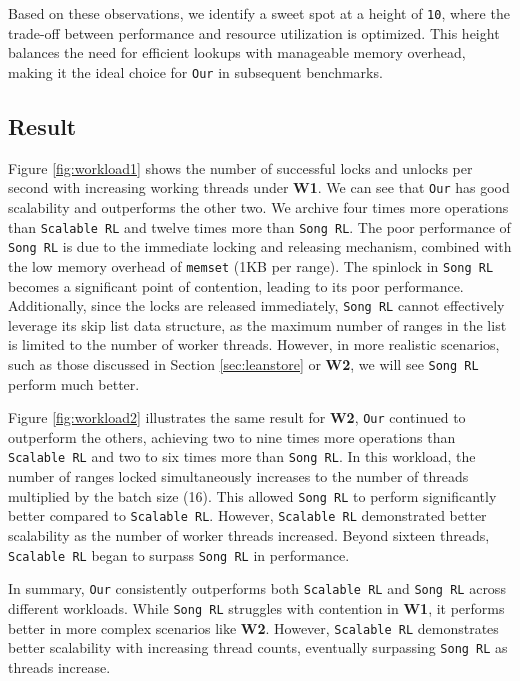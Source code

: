 Based on these observations, we identify a sweet spot at a height of \texttt{10}, where the trade-off between performance and resource utilization is optimized. 
This height balances the need for efficient lookups with manageable memory overhead, making it the ideal choice for \texttt{Our} in subsequent benchmarks.

\subsection{Result}

Figure \ref{fig:workload1} shows the number of successful locks and unlocks per second with increasing working threads under \textbf{W1}. We can see that \texttt{Our} has good scalability and outperforms the other two. 
We archive four times more operations than \texttt{Scalable RL} and twelve times more than \texttt{Song RL}. 
The poor performance of \texttt{Song RL} is due to the immediate locking and releasing mechanism, combined with the low memory overhead of \texttt{memset} (1KB per range). 
The spinlock in \texttt{Song RL} becomes a significant point of contention, leading to its poor performance. 
Additionally, since the locks are released immediately, \texttt{Song RL} cannot effectively leverage its skip list data structure, as the maximum number of ranges in the list is limited to the number of worker threads. 
However, in more realistic scenarios, such as those discussed in Section \ref{sec:leanstore} or \textbf{W2}, we will see \texttt{Song RL} perform much better.

Figure \ref{fig:workload2} illustrates the same result for \textbf{W2}, \texttt{Our} continued to outperform the others, achieving two to nine times more operations than \texttt{Scalable RL} and two to six times more than \texttt{Song RL}. 
In this workload, the number of ranges locked simultaneously increases to the number of threads multiplied by the batch size (16). 
This allowed \texttt{Song RL} to perform significantly better compared to \texttt{Scalable RL}. 
However, \texttt{Scalable RL} demonstrated better scalability as the number of worker threads increased. Beyond sixteen threads, \texttt{Scalable RL} began to surpass \texttt{Song RL} in performance.

In summary, \texttt{Our} consistently outperforms both \texttt{Scalable RL} and \texttt{Song RL} across different workloads. 
While \texttt{Song RL} struggles with contention in \textbf{W1}, it performs better in more complex scenarios like \textbf{W2}. 
However, \texttt{Scalable RL} demonstrates better scalability with increasing thread counts, eventually surpassing \texttt{Song RL} as threads increase.

